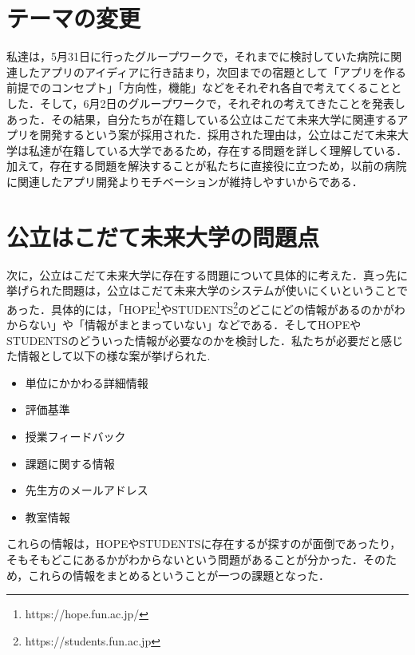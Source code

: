 
\section{テーマの変更}

私達は，5月31日に行ったグループワークで，それまでに検討していた病院に関連したアプリのアイディアに行き詰まり，次回までの宿題として「アプリを作る前提でのコンセプト」「方向性，機能」などをそれぞれ各自で考えてくることとした．そして，6月2日のグループワークで，それぞれの考えてきたことを発表しあった．その結果，自分たちが在籍している公立はこだて未来大学に関連するアプリを開発するという案が採用された．採用された理由は，公立はこだて未来大学は私達が在籍している大学であるため，存在する問題を詳しく理解している．加えて，存在する問題を解決することが私たちに直接役に立つため，以前の病院に関連したアプリ開発よりモチベーションが維持しやすいからである．



\section{公立はこだて未来大学の問題点}
次に，公立はこだて未来大学に存在する問題について具体的に考えた．真っ先に挙げられた問題は，公立はこだて未来大学のシステムが使いにくいということであった．具体的には，「HOPE\footnote{https://hope.fun.ac.jp/}やSTUDENTS\footnote{https://students.fun.ac.jp}のどこにどの情報があるのかがわからない」や「情報がまとまっていない」などである．そしてHOPEやSTUDENTSのどういった情報が必要なのかを検討した．私たちが必要だと感じた情報として以下の様な案が挙げられた.
\begin{itemize}
      \item 単位にかかわる詳細情報
      \item 評価基準
      \item 授業フィードバック
      \item 課題に関する情報
      \item 先生方のメールアドレス
      \item 教室情報
\end{itemize}
これらの情報は，HOPEやSTUDENTSに存在するが探すのが面倒であったり，そもそもどこにあるかがわからないという問題があることが分かった．そのため，これらの情報をまとめるということが一つの課題となった．


